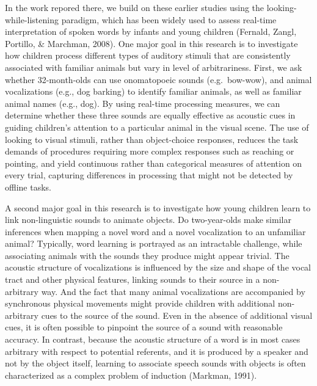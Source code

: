 \documentclass[english,floatsintext,man]{apa6}
\theoremstyle{definition}
\theoremstyle{definition}
\theoremstyle{definition}
\theoremstyle{remark}
\begin{document}
In the work repored there, we build on these earlier studies using the
looking-while-listening paradigm, which has been widely used to assess
real-time interpretation of spoken words by infants and young children
(Fernald, Zangl, Portillo, \& Marchman, 2008). One major goal in this
research is to investigate how children process different types of
auditory stimuli that are consistently associated with familiar animals
but vary in level of arbitrariness. First, we ask whether 32-month-olds
can use onomatopoeic sounds (e.g.~bow-wow), and animal vocalizations
(e.g., dog barking) to identify familiar animals, as well as familiar
animal names (e.g., dog). By using real-time processing measures, we can
determine whether these three sounds are equally effective as acoustic
cues in guiding children's attention to a particular animal in the
visual scene. The use of looking to visual stimuli, rather than
object-choice responses, reduces the task demands of procedures
requiring more complex responses such as reaching or pointing, and yield
continuous rather than categorical measures of attention on every trial,
capturing differences in processing that might not be detected by
offline tasks.

A second major goal in this research is to investigate how young
children learn to link non-linguistic sounds to animate objects. Do
two-year-olds make similar inferences when mapping a novel word and a
novel vocalization to an unfamiliar animal? Typically, word learning is
portrayed as an intractable challenge, while associating animals with
the sounds they produce might appear trivial. The acoustic structure of
vocalizations is influenced by the size and shape of the vocal tract and
other physical features, linking sounds to their source in a
non-arbitrary way. And the fact that many animal vocalizations are
accompanied by synchronous physical movements might provide children
with additional non-arbitrary cues to the source of the sound. Even in
the absence of additional visual cues, it is often possible to pinpoint
the source of a sound with reasonable accuracy. In contrast, because the
acoustic structure of a word is in most cases arbitrary with respect to
potential referents, and it is produced by a speaker and not by the
object itself, learning to associate speech sounds with objects is often
characterized as a complex problem of induction (Markman, 1991).
\end{document}
